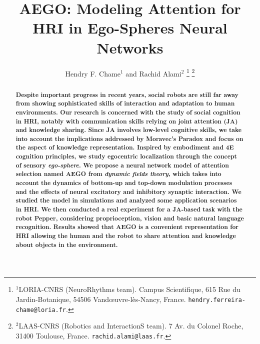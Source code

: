 \documentclass[letterpaper, 10 pt, conference]{ieeeconf}  %
\title{\LARGE \bf
	AEGO: Modeling Attention for HRI in Ego-Spheres Neural Networks
}
\author{Hendry F. Chame$^{1}$ and Rachid Alami$^{2}$%
	\thanks{$^{1}$LORIA-CNRS (NeuroRhythms team). Campus Scientifique, 615 Rue du Jardin-Botanique, 54506 Vand\oe uvre-l\`es-Nancy, France.
		{\tt \small hendry.ferreira-chame@loria.fr}.}%
	\thanks{$^{2}$LAAS-CNRS (Robotics and InteractionS team). 7 Av. du Colonel Roche, 31400 Toulouse, France.
		{\tt \small rachid.alami@laas.fr}.}%
}
\begin{document}
		
	
	\maketitle
	\thispagestyle{empty}
	\pagestyle{empty}
	
	
	\begin{abstract}
		
		
		\small \bf Despite important progress in recent years, social robots are still far away from showing sophisticated skills of interaction and adaptation to human environments. Our research is concerned with the study of social cognition in HRI, notably with communication skills relying on joint attention (JA) and knowledge sharing. Since JA involves low-level cognitive skills, we take into account the implications addressed by Moravec's Paradox and focus on the aspect of knowledge representation. Inspired by embodiment and 4E cognition principles, we study egocentric localization through the concept of sensory \textit{ego-sphere}. We propose a neural network model of attention selection named AEGO from \textit{dynamic fields theory}, which takes into account the dynamics of bottom-up and top-down modulation processes and the effects of neural excitatory and inhibitory synaptic interaction. We studied the model in simulations and analyzed some application scenarios in HRI. We then conducted a real experiment for a JA-based task with the robot Pepper, considering proprioception, vision and basic natural language recognition. Results showed that AEGO is a convenient representation for HRI allowing the human and the robot to share attention and knowledge about objects in the environment.
		

\end{abstract}
\end{document}
